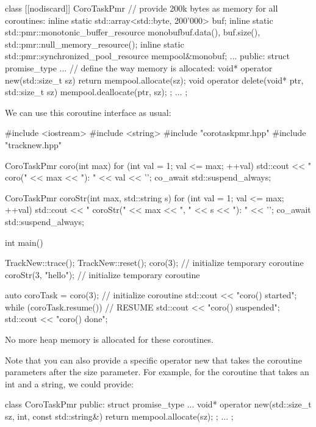 \begin{cpp}
class [[nodiscard]] CoroTaskPmr {
	// provide 200k bytes as memory for all coroutines:
	inline static std::array<std::byte, 200’000> buf;
	inline static std::pmr::monotonic_buffer_resource
		monobuf{buf.data(), buf.size(), std::pmr::null_memory_resource()};
	inline static std::pmr::synchronized_pool_resource mempool{&monobuf};
	...
public:
	struct promise_type {
		...
			// define the way memory is allocated:
		void* operator new(std::size_t sz) {
			return mempool.allocate(sz);
		}
		void operator delete(void* ptr, std::size_t sz) {
			mempool.deallocate(ptr, sz);
		}
	};
	...
};
\end{cpp}

We can use this coroutine interface as usual:


\begin{cpp}
#include <iostream>
#include <string>
#include "corotaskpmr.hpp"
#include "tracknew.hpp"

CoroTaskPmr coro(int max)
{
	for (int val = 1; val <= max; ++val) {
		std::cout << "    coro(" << max << "): " << val << '\n';
		co_await std::suspend_always{};
	}
}

CoroTaskPmr coroStr(int max, std::string s)
{
	for (int val = 1; val <= max; ++val) {
		std::cout << "    coroStr(" << max << ", " << s << "): " << '\n';
		co_await std::suspend_always{};
	}
}

int main()
{
	TrackNew::trace();
	TrackNew::reset();
	coro(3); // initialize temporary coroutine
	coroStr(3, "hello"); // initialize temporary coroutine
	
	auto coroTask = coro(3); // initialize coroutine
	std::cout << "coro() started\n";
	while (coroTask.resume()) { // RESUME
		std::cout << "coro() suspended\n";
	}
	std::cout << "coro() done\n";
}
\end{cpp}

No more heap memory is allocated for these coroutines.

Note that you can also provide a specific operator new that takes the coroutine parameters after the size parameter. For example, for the coroutine that takes an int and a string, we could provide:

\begin{cpp}
class CoroTaskPmr {
	public:
	struct promise_type {
		...
		void* operator new(std::size_t sz, int, const std::string&) {
			return mempool.allocate(sz);
		}
	};
	...
};
\end{cpp}

